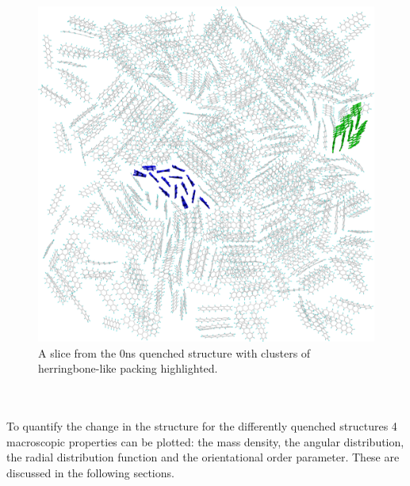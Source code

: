 \begin{figure}[h]
	\includegraphics[width=\textwidth]{./img/DifferentQuenchTimes/0ns/Slice6_4Clusters.png}
	\caption{\label{fig:ClustInst}A slice from the 0ns quenched structure with clusters of herringbone-like packing highlighted.}
\end{figure}
\\\\
\noindent To quantify the change in the structure for the differently quenched structures 4 macroscopic properties can be plotted: the mass density, the angular distribution, the radial distribution function and the orientational order parameter. These are discussed in the following sections.
